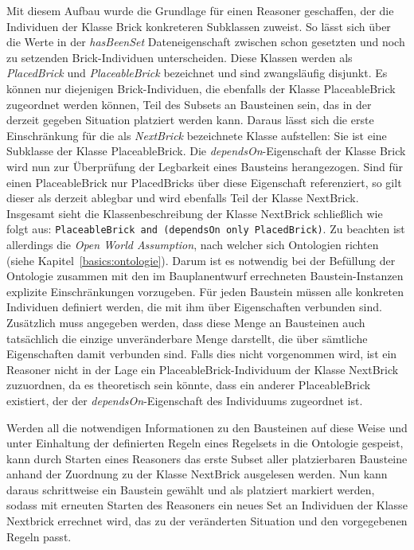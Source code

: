 Mit diesem Aufbau wurde die Grundlage für einen Reasoner geschaffen, der die Individuen der Klasse Brick konkreteren Subklassen zuweist.
So lässt sich über die Werte in der \textit{hasBeenSet} Dateneigenschaft zwischen schon gesetzten und noch zu setzenden Brick-Individuen unterscheiden.
Diese Klassen werden als \textit{PlacedBrick} und \textit{PlaceableBrick} bezeichnet und sind zwangsläufig disjunkt.
Es können nur diejenigen Brick-Individuen, die ebenfalls der Klasse PlaceableBrick zugeordnet werden können, Teil des Subsets an Bausteinen sein, das in der derzeit gegeben Situation platziert werden kann.
Daraus lässt sich die erste Einschränkung für die als \textit{NextBrick} bezeichnete Klasse aufstellen:
Sie ist eine Subklasse der Klasse PlaceableBrick.
Die  \textit{dependsOn}-Eigenschaft der Klasse Brick wird nun zur Überprüfung der Legbarkeit eines Bausteins herangezogen.
Sind für einen PlaceableBrick nur PlacedBricks über diese Eigenschaft referenziert, so gilt dieser als derzeit ablegbar und wird ebenfalls Teil der Klasse NextBrick.
Insgesamt sieht die Klassenbeschreibung der Klasse NextBrick schließlich wie folgt aus:
\lstinline{PlaceableBrick and (dependsOn only PlacedBrick)}.
Zu beachten ist allerdings die \textit{Open World Assumption}, nach welcher sich Ontologien richten (siehe Kapitel~\ref{basics:ontologie}).
Darum ist es notwendig bei der Befüllung der Ontologie zusammen mit den im Bauplanentwurf errechneten Baustein-Instanzen explizite Einschränkungen vorzugeben.
Für jeden Baustein müssen alle konkreten Individuen definiert werden, die mit ihm über Eigenschaften verbunden sind.
Zusätzlich muss angegeben werden, dass diese Menge an Bausteinen auch tatsächlich die einzige unveränderbare Menge darstellt, die über sämtliche Eigenschaften damit verbunden sind.
Falls dies nicht vorgenommen wird, ist ein Reasoner nicht in der Lage ein PlaceableBrick-Individuum der Klasse NextBrick zuzuordnen, da es theoretisch sein könnte, dass ein anderer PlaceableBrick existiert, der der \textit{dependsOn}-Eigenschaft des Individuums zugeordnet ist.

Werden all die notwendigen Informationen zu den Bausteinen auf diese Weise und unter Einhaltung der definierten Regeln eines Regelsets in die Ontologie gespeist, kann durch Starten eines Reasoners das erste Subset aller platzierbaren Bausteine anhand der Zuordnung zu der Klasse NextBrick ausgelesen werden.
Nun kann daraus schrittweise ein Baustein gewählt und als platziert markiert werden, sodass mit erneuten Starten des Reasoners ein neues Set an Individuen der Klasse Nextbrick errechnet wird, das zu der veränderten Situation und den vorgegebenen Regeln passt.
